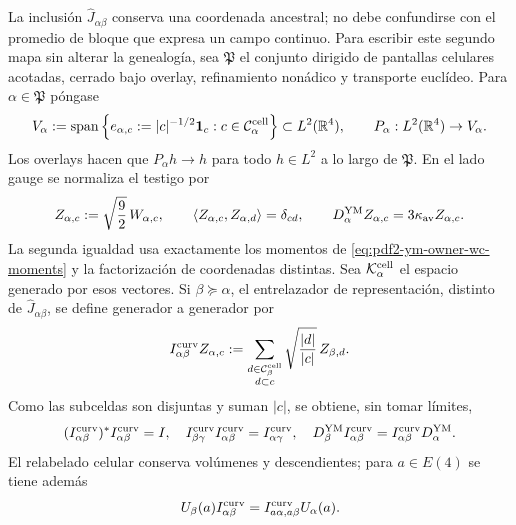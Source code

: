 La inclusión $\widehat J_{\alpha\beta}$ conserva una coordenada ancestral; no debe
confundirse con el promedio de bloque que expresa un campo continuo. Para escribir
este segundo mapa sin alterar la genealogía, sea $\mathfrak P$ el conjunto dirigido
de pantallas celulares acotadas, cerrado bajo overlay, refinamiento nonádico y
transporte euclídeo. Para $\alpha\in\mathfrak P$ póngase
\begin{equation}\label{eq:pdf2-ym-owner-cell-step-space}
 V_\alpha:=\operatorname{span}\left\{
 e_{\alpha,c}:=|c|^{-1/2}\mathbf1_c:
 c\in\mathcal C_\alpha^{\rm cell}\right\}
 \subset L^2(\mathbb R^4),
 \qquad P_\alpha:L^2(\mathbb R^4)\to V_\alpha.
\end{equation}
Los overlays hacen que $P_\alpha h\to h$ para todo $h\in L^2$ a lo largo de
$\mathfrak P$. En el lado gauge se normaliza el testigo por
\begin{equation}\label{eq:pdf2-ym-owner-normalized-cell-witness}
 Z_{\alpha,c}:=\sqrt{\frac92}\,W_{\alpha,c},
 \qquad
 \langle Z_{\alpha,c},Z_{\alpha,d}\rangle=\delta_{cd},
 \qquad
 D_\alpha^{\rm YM}Z_{\alpha,c}=3\kappa_{\rm av}Z_{\alpha,c}.
\end{equation}
La segunda igualdad usa exactamente los momentos de
\eqref{eq:pdf2-ym-owner-wc-moments} y la factorización de coordenadas distintas.
Sea $\mathcal K_\alpha^{\rm cell}$ el espacio generado por esos vectores. Si
$\beta\succeq\alpha$, el entrelazador de representación, distinto de
$\widehat J_{\alpha\beta}$, se define generador a generador por
\begin{equation}\label{eq:pdf2-ym-owner-block-intertwiner}
 I_{\alpha\beta}^{\rm curv}Z_{\alpha,c}
 :=\sum_{\substack{d\in\mathcal C_\beta^{\rm cell}\\d\subset c}}
       \sqrt{\frac{|d|}{|c|}}\,Z_{\beta,d}.
\end{equation}
Como las subceldas son disjuntas y suman $|c|$, se obtiene, sin tomar límites,
\begin{equation}\label{eq:pdf2-ym-owner-block-intertwiner-identities}
 (I_{\alpha\beta}^{\rm curv})^*I_{\alpha\beta}^{\rm curv}=I,
 \quad
 I_{\beta\gamma}^{\rm curv}I_{\alpha\beta}^{\rm curv}
 =I_{\alpha\gamma}^{\rm curv},
 \quad
 D_\beta^{\rm YM}I_{\alpha\beta}^{\rm curv}
 =I_{\alpha\beta}^{\rm curv}D_\alpha^{\rm YM}.
\end{equation}
El relabelado celular conserva volúmenes y descendientes; para $a\in E(4)$ se tiene además
\begin{equation}\label{eq:pdf2-ym-owner-block-e4-naturality}
 U_\beta(a)I_{\alpha\beta}^{\rm curv}
 =I_{a\alpha,a\beta}^{\rm curv}U_\alpha(a).
\end{equation}

